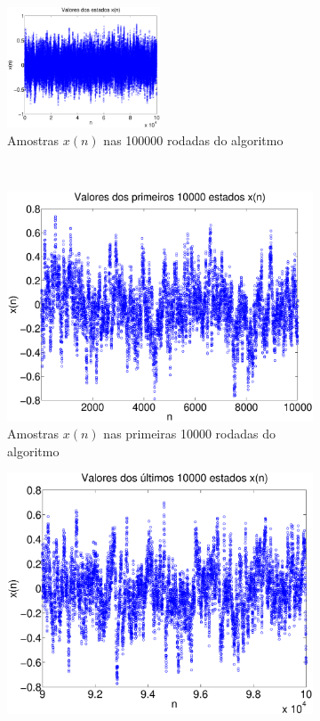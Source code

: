 \documentclass{report}
\begin{document}
\begin{figure}[H]
	\centering
	\begin{subfigure}{\textwidth}
		\centering
		\includegraphics[width = 0.5\textwidth]{Q03_A_valores_x.eps}
		\caption{Amostras $x(n)$ nas 100000 rodadas do algoritmo}
	\end{subfigure}\\[0.5cm]
	\begin{subfigure}{0.4\textwidth}
		\centering
		\includegraphics[width = \textwidth]{Q03_A_primeiros_valores_x.eps}
		\caption{Amostras $x(n)$ nas primeiras 10000 rodadas do algoritmo}
	\end{subfigure}
	\hspace{2cm}
	\begin{subfigure}{0.4\textwidth}
		\centering
		\includegraphics[width = \textwidth]{Q03_A_ultimos_valores_x.eps}

\end{subfigure}
\end{figure}
\end{document}
